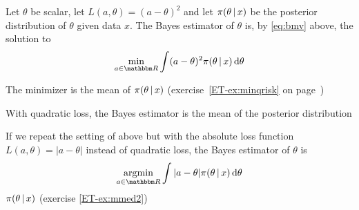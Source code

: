 \begin{frame}
     
    \vspace{2em}
    \Eg
    Let $\theta$ be scalar, let $L(a, \theta) = (a - \theta)^2$ and let
    $\pi(\theta \, | \, x)$ be the posterior distribution of $\theta$ given
    data $x$.  The Bayes estimator of $\theta$ is, by \eqref{eq:bmv} above, the
    solution to 
    \begin{equation*}
           \min_{a \in \RR} 
            \int (a - \theta)^2 \pi(\theta \given x) \diff \theta   
    \end{equation*}
    
    \vspace{.7em}
    The minimizer is the mean of 
    $\pi(\theta \, | \, x)$ (exercise~\ref{ET-ex:minqrisk} on
    page~\pageref{ET-ex:minqrisk})
    
    \vspace{.7em}
    With quadratic loss, the Bayes
    estimator is the mean of the posterior distribution
    
\end{frame}

\begin{frame}

    \vspace{2em}
    \Eg
    If we repeat the setting of above but with the absolute
    loss function $L(a, \theta) = |a - \theta|$ instead of quadratic loss, the 
    Bayes estimator of $\theta$ is
    \begin{equation*}
           \argmin_{a \in \RR} 
            \int |a - \theta| \pi(\theta \given x) \diff \theta   
    \end{equation*}
    $\pi(\theta \, | \, x)$ (exercise \ref{ET-ex:mmed2})

\end{frame}


